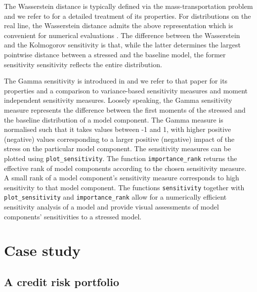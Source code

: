 \documentclass[
]{article}
\begin{document}
The Wasserstein distance is typically defined via the mass-transportation problem and we refer to \citet{Villani2008book} for a detailed treatment of its properties. For distributions on the real line, the Wasserstein distance admits the above representation which is convenient for numerical evaluations \citep{Vallender1974TPA}. The difference between the Wasserstein and the Kolmogorov sensitivity is that, while the latter determines the largest pointwise distance between a stressed and the baseline model, the former sensitivity sensitivity reflects the entire distribution.

The Gamma sensitivity is introduced in \citet{Pesenti2019} and we refer to that paper for its properties and a comparison to variance-based sensitivity measures and moment independent sensitivity measures. Loosely speaking, the Gamma sensitivity measure represents the difference between the first moments of the stressed and the baseline distribution of a model component. The Gamma measure is normalised such that it takes values between -1 and 1, with higher positive (negative) values corresponding to a larger positive (negative) impact of the stress on the particular model component. The sensitivity measures can be plotted using \texttt{plot\_sensitivity}. The function \texttt{importance\_rank} returns the effective rank of model components according to the chosen sensitivity measure. A small rank of a model component's sensitivity measure corresponds to high sensitivity to that model component. The functions \texttt{sensitivity} together with \texttt{plot\_sensitivity} and \texttt{importance\_rank} allow for a numerically efficient sensitivity analysis of a model and provide visual assessments of model components' sensitivities to a stressed model.

\hypertarget{Sec:CreditModel}{%
\section{Case study}\label{Sec:CreditModel}}

\hypertarget{a-credit-risk-portfolio}{%
\subsection{A credit risk portfolio}\label{a-credit-risk-portfolio}}
\end{document}
